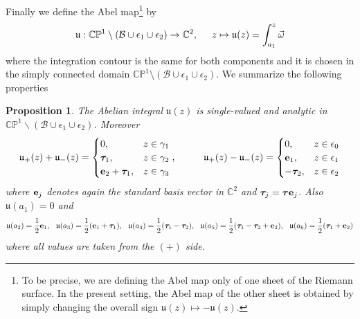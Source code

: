 \documentclass[10pt,oneside,reqno]{amsart}
\numberwithin{equation}{section}
\newtheorem{proposition}[theorem]{Proposition}
\def\ds{\displaystyle}
\def\bp{\begin{proposition}}
\def\ep{\end{proposition}}
\def\be{\begin{equation}}
\def\ee{\end{equation}}
\def\C{{\mathbb C}}
\def\u{\mathfrak u}
\begin{document}
Finally we define the Abel map\footnote{To be precise, we are defining the Abel map only of one sheet of the Riemann surface. In the present setting, the Abel map of the other sheet is obtained by simply changing the overall sign $\u(z) \mapsto -\u(z)$.} by 
\begin{equation*}
 	\u: \C\mathbb P^1 \setminus (\mathcal B\cup \epsilon_1\cup \epsilon_2)\rightarrow \C^2,\hspace{0.5cm}z  \mapsto  \ds \u(z) = \int_{a_1}^z \vec \omega
\end{equation*}
where the integration contour is the same for both components and it is chosen in the simply connected domain $\C\mathbb P^1 \setminus (\mathcal B\cup \epsilon_1\cup \epsilon_2)$. We summarize the following properties
\bp\label{Abprop} The Abelian integral $\mathfrak{u}(z)$ is single-valued and analytic in $\mathbb{CP}^1\backslash(\mathcal{B}\cup\epsilon_1\cup\epsilon_2)$. Moreover
\begin{equation*}
  \mathfrak{u}_+(z)+\mathfrak{u}_-(z) = \begin{cases}
                                                     0,&z\in \gamma_1\\
{\boldsymbol \tau}_1,&z\in \gamma_2\\
{\bf e}_2+{\boldsymbol \tau}_1,&z\in \gamma_3\\
                                                    \end{cases},\hspace{1cm}\mathfrak{u}_+(z)-\mathfrak{u}_-(z) = \begin{cases}
0,&z\in \epsilon_0\\
{\bf e}_1,&z\in \epsilon_1\\
-{\boldsymbol \tau}_2,&z\in \epsilon_2
\end{cases}
\end{equation*}
where ${\bf e}_j$ denotes again the standard basis vector in $\mathbb{C}^2$ and ${\boldsymbol \tau}_j={\boldsymbol \tau}{\bf e}_j$. Also $\mathfrak{u}(a_1)=0$ and
\begin{equation*}
 \mathfrak{u}(a_2) = \frac{1}{2}{\bf e}_1,\hspace{0.25cm}\mathfrak{u}(a_3)=\frac{1}{2}({\bf e}_1+{\boldsymbol \tau}_1),
  \hspace{0.25cm}\mathfrak{u}(a_4) = \frac{1}{2}({\boldsymbol \tau}_1-{\boldsymbol \tau}_2),\hspace{0.25cm}\mathfrak{u}(a_5) =\frac{1}{2}({\boldsymbol \tau}_1-{\boldsymbol \tau}_2+{\bf e}_2),
  \hspace{0.25cm}\mathfrak{u}(a_6) = \frac{1}{2}({\boldsymbol \tau}_1+{\bf e}_2)
\end{equation*}
where all values are taken from the $(+)$ side.
\ep
\end{document}
